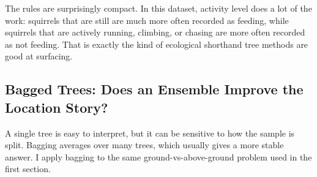 \documentclass[
  11pt,
]{article}
\newenvironment{Shaded}{\begin{snugshade}}{\end{snugshade}}
\newcommand{\AttributeTok}[1]{\textcolor[rgb]{0.13,0.29,0.53}{#1}}
\newcommand{\ControlFlowTok}[1]{\textcolor[rgb]{0.13,0.29,0.53}{\textbf{#1}}}
\newcommand{\DecValTok}[1]{\textcolor[rgb]{0.00,0.00,0.81}{#1}}
\newcommand{\FunctionTok}[1]{\textcolor[rgb]{0.13,0.29,0.53}{\textbf{#1}}}
\newcommand{\NormalTok}[1]{#1}
\newcommand{\OtherTok}[1]{\textcolor[rgb]{0.56,0.35,0.01}{#1}}
\newcommand{\SpecialCharTok}[1]{\textcolor[rgb]{0.81,0.36,0.00}{\textbf{#1}}}
\newcommand{\StringTok}[1]{\textcolor[rgb]{0.31,0.60,0.02}{#1}}
\begin{document}
The rules are surprisingly compact. In this dataset, activity level does
a lot of the work: squirrels that are still are much more often recorded
as feeding, while squirrels that are actively running, climbing, or
chasing are more often recorded as not feeding. That is exactly the kind
of ecological shorthand tree methods are good at surfacing.

\subsection{Bagged Trees: Does an Ensemble Improve the Location
Story?}\label{bagged-trees-does-an-ensemble-improve-the-location-story}

A single tree is easy to interpret, but it can be sensitive to how the
sample is split. Bagging averages over many trees, which usually gives a
more stable answer. I apply bagging to the same ground-vs-above-ground
problem used in the first section.

\begin{Shaded}
\end{Shaded}
\end{document}
